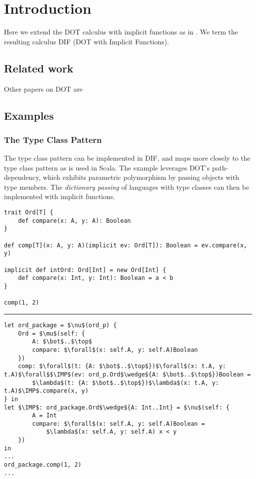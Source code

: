 \section{Introduction}

Here we extend the DOT calculus \cite{AGORS16} with implicit functions as in
\cite{OBLB18}. We term the resulting calculus DIF (DOT with Implicit Functions).

\subsection{Related work}

Other papers on DOT are \cite{ARO14, AR17, AR16, AMO12}

\subsection{Examples}

\subsubsection{The Type Class Pattern}

The type class pattern \cite{OBLB18} can be implemented in DIF, and maps more
closely to the type class pattern as is used in Scala. The example leverages
DOT's path-dependency, which exhibits parametric polymorphism by passing
objects with type members. The \emph{dictionary passing} \cite{K88, WB89} of
languages with type classes can then be implemented with implicit functions.

\begin{lstlisting}[mathescape]
trait Ord[T] {
    def compare(x: A, y: A): Boolean
}

def comp[T](x: A, y: A)(implicit ev: Ord[T]): Boolean = ev.compare(x, y)

implicit def intOrd: Ord[Int] = new Ord[Int] {
    def compare(x: Int, y: Int): Boolean = a < b
}

comp(1, 2)
\end{lstlisting}

\hrule

\begin{lstlisting}[mathescape]
let ord_package = $\nu$(ord_p) {
    Ord = $\mu$(self: {
        A: $\bot$..$\top$
        compare: $\forall$(x: self.A, y: self.A)Boolean
    })
    comp: $\forall$(t: {A: $\bot$..$\top$})$\forall$(x: t.A, y: t.A)$\forall$$\IMP$(ev: ord_p.Ord$\wedge${A: $\bot$..$\top$})Boolean =
        $\lambda$(t: {A: $\bot$..$\top$})$\lambda$(x: t.A, y: t.A)$\IMP$.compare(x, y)
} in
let $\IMP$: ord_package.Ord$\wedge${A: Int..Int} = $\nu$(self: {
        A = Int
        compare: $\forall$(x: self.A, y: self.A)Boolean =
            $\lambda$(x: self.A, y: self.A) x < y
    })
in
...
ord_package.comp(1, 2)
...
\end{lstlisting}
